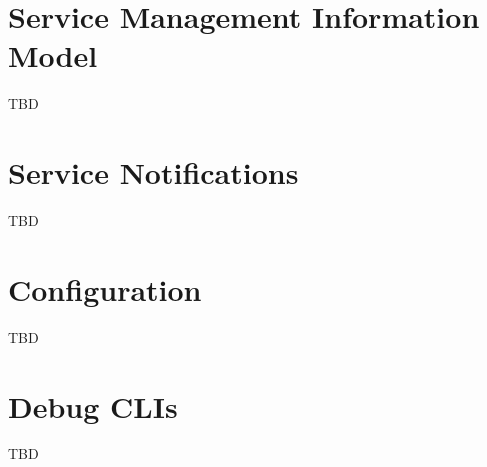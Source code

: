 \begin{flushleft}
\chapter{Service Management Information Model}
TBD

\chapter{Service Notifications}
TBD

\chapter{Configuration}
TBD


\chapter{Debug CLIs}
TBD

\end{flushleft}
